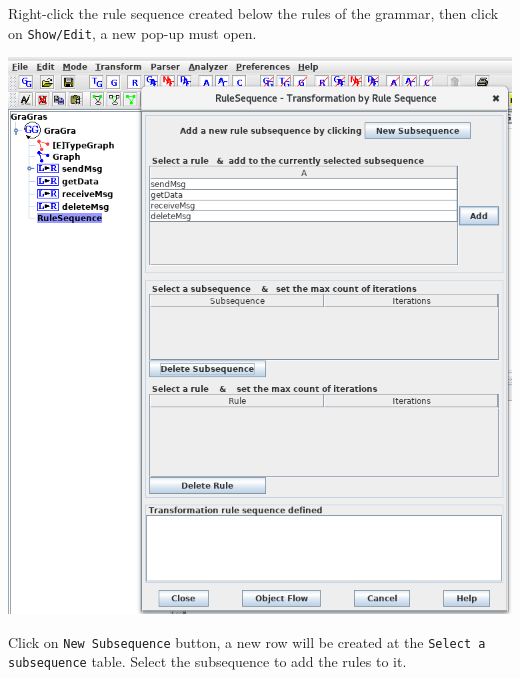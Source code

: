 \documentclass[12pt]{article}
\newenvironment{tutorialstep}
	{\hspace{-\parindent}\begin{minipage}{\textwidth}}
    {\vspace{.3cm}\end{minipage}}
\begin{document}
\begin{tutorialstep}
  Right-click the rule sequence created below the rules of the grammar, then click on \texttt{Show/Edit}, a new pop-up must open.\\

  \begin{center}
  \noindent
  \centering
  \includegraphics[scale = 0.5]{rule-sequence_02.png}\\
  \end{center}
  
  Click on \texttt{New Subsequence} button, a new row will be created at the \texttt{Select a subsequence} table. Select the subsequence to add the rules to it.
\end{tutorialstep}
\end{document}

